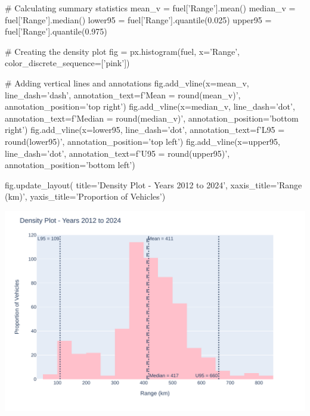 \begin{samepage}
\begin{pythoncode}
# Calculating summary statistics
mean_v = fuel['Range'].mean()
median_v = fuel['Range'].median()
lower95 = fuel['Range'].quantile(0.025)
upper95 = fuel['Range'].quantile(0.975)

# Creating the density plot
fig = px.histogram(fuel, x='Range', 
         color_discrete_sequence=['pink'])

# Adding vertical lines and annotations
fig.add_vline(x=mean_v, line_dash='dash', 
      annotation_text=f'Mean = {round(mean_v)}', 
      annotation_position='top right')
fig.add_vline(x=median_v, line_dash='dot', 
      annotation_text=f'Median = {round(median_v)}', 
      annotation_position='bottom right')
fig.add_vline(x=lower95, line_dash='dot', 
      annotation_text=f'L95 = {round(lower95)}', 
      annotation_position='top left')
fig.add_vline(x=upper95, line_dash='dot', 
      annotation_text=f'U95 = {round(upper95)}', 
      annotation_position='bottom left')

fig.update_layout(
    title='Density Plot - Years 2012 to 2024',
    xaxis_title='Range (km)',
    yaxis_title='Proportion of Vehicles')
\end{pythoncode}
\end{samepage}

\begin{center}
    \includegraphics[width=.8\textwidth]{px.histogram2.pdf}
\end{center}

